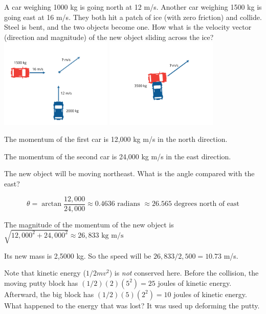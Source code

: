 \begin{Exercise}[title={Cars on Ice}, label=cars_on_ice]
A car weighing 1000 kg is going north at 12 m/s.  Another car weighing
1500 kg is going east at 16 m/s.  They both hit a patch of ice (with
zero friction) and collide.  Steel is bent, and the two objects become
one.  How what is the velocity vector (direction and magnitude) of the
new object sliding across the ice?
\includegraphics[width=0.4\textwidth]{icecar.png}
\includegraphics[width=0.4\textwidth]{icecar2.png}

\end{Exercise}
\begin{Answer}[ref=cars_on_ice]
  The momentum of the first car is 12,000 kg m/s in the north direction.

  The momentum of the second car is 24,000 kg m/s in the east direction.

  The new object will be moving northeast. What is the angle compared with the east?

  $$\theta = \arctan{\frac{12,000}{24,000}} \approx 0.4636 \text{ radians } \approx 26.565\text{ degrees north of east}$$

  The magnitude of the momentum of the new object is $\sqrt{12,000^2 + 24,000^2} \approx 26,833\text{ kg m/s}$

  Its new mass is 2,5000 kg.  So the speed will be $26,833/2,500 = 10.73$ m/s.
\end{Answer}


Note that kinetic energy ($1/2 m v^2$) is \emph{not} conserved
here.  Before the collision, the moving putty block has $(1/2)(2)(5^2) = 25$
joules of kinetic energy.  Afterward, the big block has $(1/2)(5)(2^2)
= 10$ joules of kinetic energy.  What happened to the energy that was
lost? It was used up deforming the putty.

